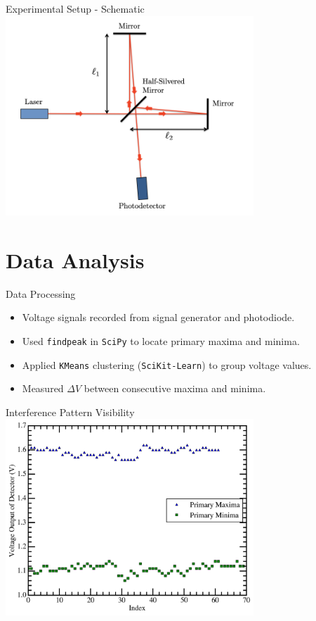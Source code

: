 \documentclass[aspectratio = 169]{beamer}
\begin{document}
\begin{frame}{Experimental Setup - Schematic}
    \centering
    \includegraphics[width=0.7\textwidth]{fig/michelson_setup.png}
    \caption{Schematic of the Michelson interferometer. Adapted from \cite{MITOpticalInterferometry2023}.}
\end{frame}

\section{Data Analysis}
\begin{frame}{Data Processing}
    \begin{itemize}
        \item Voltage signals recorded from signal generator and photodiode.
        \item Used \texttt{findpeak} in \texttt{SciPy} to locate primary maxima and minima.
        \item Applied \texttt{KMeans} clustering (\texttt{SciKit-Learn}) to group voltage values.
        \item Measured $\Delta V$ between consecutive maxima and minima.
    \end{itemize}
\end{frame}

\begin{frame}{Interference Pattern Visibility}
    \centering
    \includegraphics[width=0.7\textwidth]{fig/Intensity.png}
    \caption{Voltage output of photodiode corresponding to maxima and minima.}
\end{frame}
\end{document}
